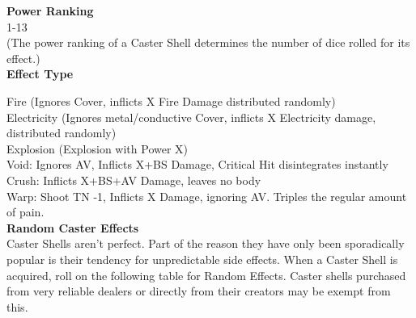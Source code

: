 \documentclass[a4paper, twocolumn, openany]{book}
\newlength{\indentlen}
\newcommand{\tabto}[1]{\setlength{\leftskip}{#1\indentlen}}
\begin{document}
{{\bfseries Power Ranking\\}
1-13\\
(The power ranking of a Caster Shell determines the number of dice rolled for its effect.)\\

{\bfseries Effect Type\\}

\tabto{1}
Fire (Ignores Cover, inflicts X Fire Damage distributed randomly)\\
Electricity (Ignores metal/conductive Cover, inflicts X Electricity damage, distributed randomly)\\
Explosion (Explosion with Power X)\\
Void: Ignores AV, Inflicts X+BS Damage, Critical Hit disintegrates instantly\\
Crush: Inflicts X+BS+AV Damage, leaves no body\\
Warp: Shoot TN -1, Inflicts X Damage, ignoring AV. Triples the regular amount of pain.\\

\tabto{0}
{\bfseries Random Caster Effects\\}
Caster Shells aren’t perfect. Part of the reason they have only been sporadically popular is their
tendency for unpredictable side effects. When a Caster Shell is acquired, roll on the following
table for Random Effects. Caster shells purchased from very reliable dealers or directly from
their creators may be exempt from this.\\ 


}
\end{document}
